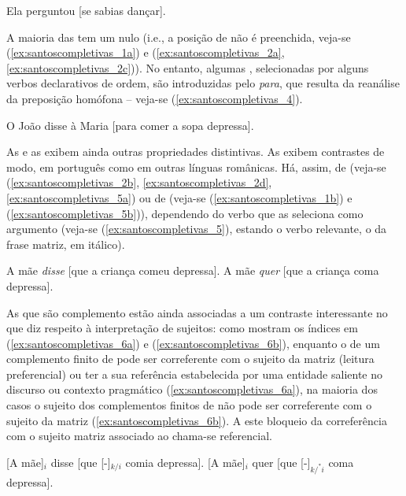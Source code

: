 \documentclass[output=paper]{LSP/langsci}
\begin{document}
\ea\label{ex:santoscompletivas_3}
Ela perguntou [se sabias dançar].
\z

A maioria das  tem um  nulo (i.e., a posição de  não é preenchida, veja-se (\ref{ex:santoscompletivas_1a}) e (\ref{ex:santoscompletivas_2a},\ref{ex:santoscompletivas_2c})). No entanto, algumas , selecionadas por alguns verbos declarativos de ordem, são introduzidas pelo  \textit{para}, que resulta da reanálise da preposição homófona – veja-se (\ref{ex:santoscompletivas_4}).

\ea\label{ex:santoscompletivas_4}
O João disse à Maria [para comer a sopa depressa].
\z

As  e as  exibem ainda outras propriedades distintivas. As  exibem contrastes de modo, em português como em outras línguas românicas. Há, assim,  de  (veja-se (\ref{ex:santoscompletivas_2b}, \ref{ex:santoscompletivas_2d}, \ref{ex:santoscompletivas_5a}) ou de  (veja-se (\ref{ex:santoscompletivas_1b}) e (\ref{ex:santoscompletivas_5b})), dependendo do verbo que as seleciona como argumento (veja-se (\ref{ex:santoscompletivas_5}), estando o verbo relevante, o da frase matriz, em itálico).

\ea\label{ex:santoscompletivas_5}
\ea\label{ex:santoscompletivas_5a} A mãe \textit{disse} [que a criança comeu depressa].
\ex\label{ex:santoscompletivas_5b} A mãe \textit{quer} [que a criança coma depressa].
\zl

As  que são complemento estão ainda associadas a um contraste interessante no que diz respeito à interpretação de sujeitos: como mostram os índices em (\ref{ex:santoscompletivas_6a}) e (\ref{ex:santoscompletivas_6b}), enquanto o  de um complemento finito de  pode ser correferente com o sujeito da matriz (leitura preferencial) ou ter a sua referência estabelecida por uma entidade saliente no discurso ou contexto pragmático (\ref{ex:santoscompletivas_6a}), na maioria dos casos o sujeito dos complementos finitos de  não pode ser correferente com o sujeito da matriz (\ref{ex:santoscompletivas_6b}). A este bloqueio da correferência com o sujeito matriz associado ao  chama-se  referencial.

\ea\label{ex:santoscompletivas_6}
\ea\label{ex:santoscompletivas_6a} [A mãe]$_i$ disse [que [-]$_{k/i}$ comia depressa].
\ex\label{ex:santoscompletivas_6b} [A mãe]$_i$ quer [que [-]$_{k/^{*}i}$ coma depressa].
\zl
\end{document}
